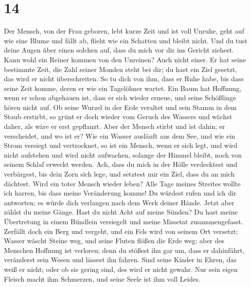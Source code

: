 \hypertarget{section-13}{%
\section{14}\label{section-13}}

 Der Mensch, von der Frau geboren, lebt kurze Zeit und ist
voll Unruhe,  geht auf wie eine Blume und fällt ab, flieht
wie ein Schatten und bleibt nicht.  Und du tust deine
Augen über einen solchen auf, dass du mich vor dir ins Gericht ziehest.
 Kann wohl ein Reiner kommen von den Unreinen? Auch nicht
einer.  Er hat seine bestimmte Zeit, die Zahl seiner
Monden steht bei dir; du hast ein Ziel gesetzt, das wird er nicht
überschreiten.  So tu dich von ihm, dass er Ruhe habe, bis
dass seine Zeit komme, deren er wie ein Tagelöhner wartet.
 Ein Baum hat Hoffnung, wenn er schon abgehauen ist, dass
er sich wieder erneue, und seine Schößlinge hören nicht auf.
 Ob seine Wurzel in der Erde veraltet und sein Stamm in
dem Staub erstirbt,  so grünt er doch wieder vom Geruch
des Wassers und wächst daher, als wäre er erst gepflanzt.
 Aber der Mensch stirbt und ist dahin; er verscheidet,
und wo ist er?  Wie ein Wasser ausläuft aus dem See, und
wie ein Strom versiegt und vertrocknet,  so ist ein
Mensch, wenn er sich legt, und wird nicht aufstehen und wird nicht
aufwachen, solange der Himmel bleibt, noch von seinem Schlaf erweckt
werden.  Ach, dass du mich in der Hölle verdecktest und
verbärgest, bis dein Zorn sich lege, und setztest mir ein Ziel, dass du
an mich dächtest.  Wird ein toter Mensch wieder leben?
Alle Tage meines Streites wollte ich harren, bis dass meine Veränderung
komme!  Du würdest rufen und ich dir antworten; es würde
dich verlangen nach dem Werk deiner Hände.  Jetzt aber
zählst du meine Gänge. Hast du nicht Acht auf meine Sünden?
 Du hast meine Übertretung in einem Bündlein versiegelt
und meine Missetat zusammengefasst.  Zerfällt doch ein
Berg und vergeht, und ein Fels wird von seinem Ort versetzt;
 Wasser wäscht Steine weg, und seine Fluten flößen die
Erde weg: aber des Menschen Hoffnung ist verloren;  denn
du stößest ihn gar um, dass er dahinfährt, veränderst sein Wesen und
lässest ihn fahren.  Sind seine Kinder in Ehren, das weiß
er nicht; oder ob sie gering sind, des wird er nicht gewahr.
 Nur sein eigen Fleisch macht ihm Schmerzen, und seine
Seele ist ihm voll Leides.

